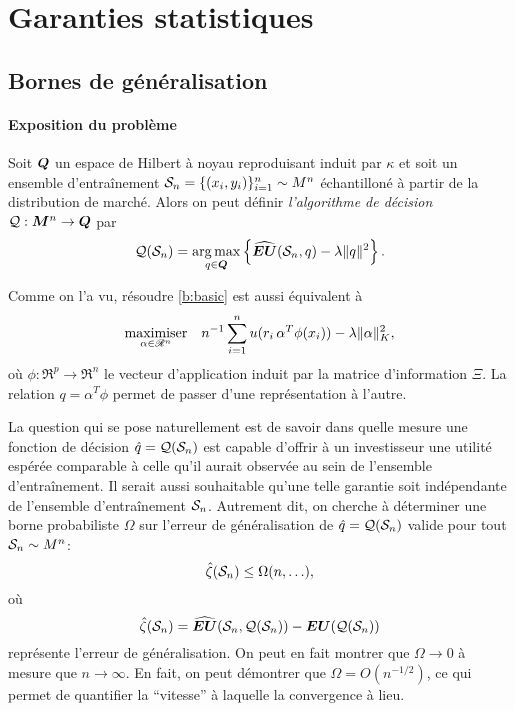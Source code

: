 \section{Garanties statistiques}





\subsection{Bornes de généralisation}




\paragraph{Exposition du problème}

Soit $\Q$ un espace de Hilbert à noyau reproduisant induit par $\kappa$ et soit un ensemble
d'entraînement $\S_n = \{(x_i,y_i)\}_{i=1}^n \sim M^n$ échantilloné à partir de la
distribution de marché. Alors on peut définir \textit{l'algorithme de décision}
$\alg:\M^n \to \Q$ par
\begin{equation}
  \label{b:basic}
  \alg(\S_n) = \argmax_{q \in \Q} \left\{\widehat\EU(\S_n,q) - \lambda\nq{q}^2\right\}.
\end{equation}

Comme on l'a vu, résoudre \eqref{b:basic} est aussi équivalent à
\begin{equation}
  \maximizeEquation[\alpha \in \Re^n]{n^{-1} \sumi u(r_i\,\alpha^T\phi(x_i)) - \lambda \|\alpha\|^2_K,}
\end{equation}
où $\phi:\Re^p \to \Re^n$ le vecteur d'application induit par la matrice d'information $\Xi$. La
relation $q = \alpha^T\phi$ permet de passer d'une représentation à l'autre.

La question qui se pose naturellement est de savoir dans quelle mesure une fonction de
décision $\hat q = \alg(\S_n)$ est capable d'offrir à un investisseur une utilité espérée
comparable à celle qu'il aurait observée au sein de l'ensemble d'entraînement. Il serait
aussi souhaitable qu'une telle garantie soit indépendante de l'ensemble d'entraînement
$\S_n$. Autrement dit, on cherche à déterminer une borne probabiliste $\Omega$ sur l'erreur de
généralisation de $\hat q = \alg(\S_n)$ valide pour tout $\S_n \sim M^n$:
\begin{equation}
 \hat\zeta(\S_n) \leq \Omega(n,\ldots),
\end{equation}
où
\begin{equation}
  \label{b:zeta}
  \hat\zeta(\S_n) =  \hEU(\S_n,\alg(\S_n)) - \EU(\alg(\S_n))
\end{equation}
représente l'erreur de généralisation. On peut en fait montrer que $\Omega \to 0$ à mesure que
$n \to \infty$. En fait, on peut démontrer que $\Omega = O(n^{-1/2})$, ce qui permet de quantifier la
``vitesse'' à laquelle la convergence à lieu.


